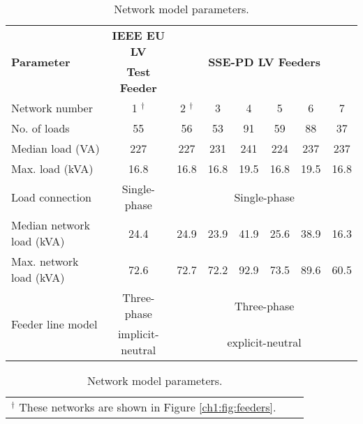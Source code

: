 \singlespacing
\begin{table}[htb]\centering
\small
\begin{tabular}{lccccccc}%
\hline
\multirow{2}{*}{\textbf{Parameter}} & \textbf{IEEE EU LV} & \multicolumn{6}{c}{\multirow{2}{*}{\textbf{SSE-PD LV Feeders}}}\\
 & \textbf{Test Feeder} & \\
\hline
Network number & 1 $^{\dagger}$ & 2 $^{\dagger}$ & 3 & 4 & 5 & 6 & 7\\
\hline
No. of loads & 55 & 56 & 53 & 91 & 59 & 88 & 37\\
\hline
Median load (VA) & 227 & 227 & 231 & 241 & 224 & 237 & 237\\
\hline
Max. load (kVA)& 16.8 & 16.8 & 16.8 & 19.5 & 16.8 & 19.5 & 16.8\\
\hline
Load connection & Single-phase & \multicolumn{6}{c}{Single-phase}\\
\hline
Median network load (kVA)& 24.4 & 24.9 & 23.9 & 41.9 & 25.6 & 38.9 & 16.3\\
\hline
Max. network load (kVA)& 72.6 & 72.7 & 72.2 & 92.9 & 73.5 & 89.6 & 60.5\\ 
\hline	
\multirow{2}{*}{Feeder line model} & Three-phase & \multicolumn{6}{c}{Three-phase}\\
 & implicit-neutral & \multicolumn{6}{c}{explicit-neutral}\\
 \hline
\end{tabular}
\caption{Network model parameters.}
\label{ch1:tab:model-parameters}
\begin{tabular}{ccc}
\multicolumn{1}{c}{\footnotesize $^{\dagger}$ These networks are shown in Figure \ref{ch1:fig:feeders}.}
\end{tabular}
\end{table}
\doublespacing